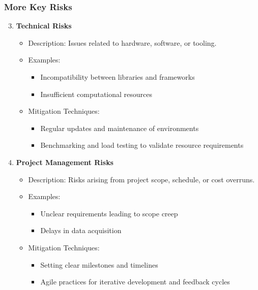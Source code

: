 \documentclass[aspectratio=169]{beamer}
\begin{document}
\begin{frame}[fragile]
    \frametitle{More Key Risks}
    \begin{enumerate}
        \setcounter{enumi}{2} %
        \item \textbf{Technical Risks}
        \begin{itemize}
            \item Description: Issues related to hardware, software, or tooling.
            \item Examples:
            \begin{itemize}
                \item Incompatibility between libraries and frameworks
                \item Insufficient computational resources
            \end{itemize}
            \item Mitigation Techniques:
            \begin{itemize}
                \item Regular updates and maintenance of environments
                \item Benchmarking and load testing to validate resource requirements
            \end{itemize}
        \end{itemize}

        \item \textbf{Project Management Risks}
        \begin{itemize}
            \item Description: Risks arising from project scope, schedule, or cost overruns.
            \item Examples:
            \begin{itemize}
                \item Unclear requirements leading to scope creep
                \item Delays in data acquisition
            \end{itemize}
            \item Mitigation Techniques:
            \begin{itemize}
                \item Setting clear milestones and timelines
                \item Agile practices for iterative development and feedback cycles
            \end{itemize}
        \end{itemize}
    \end{enumerate}
\end{frame}
\end{document}
